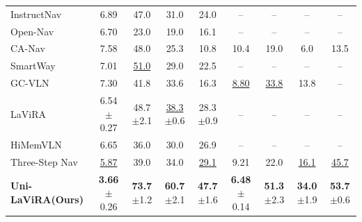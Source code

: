 \documentclass[conference]{IEEEtran}
\newcommand{\ourmethod}{Uni-LaViRA\xspace}
\begin{document}
\begin{table}[t]
{\begin{tabular}{l|cccc|cccc}
InstructNav~\cite{long2024instructnav}              & 6.89 & 47.0 & 31.0 & 24.0 & --   & --   & --   & --   \\
Open-Nav~\cite{qiao2024opennav}                     & 6.70 & 23.0 & 19.0 & 16.1 & --   & --   & --   & --   \\
CA-Nav~\cite{chen2025canav}                         & 7.58 & 48.0 & 25.3 & 10.8 & 10.4 & 19.0 & 6.0  & 13.5 \\
SmartWay~\cite{shi2025smartway}                     & 7.01 & \underline{51.0} & 29.0 & 22.5 & --   & --   & --   & --   \\
GC-VLN~\cite{yin2025gcvln}                          & 7.30 & 41.8 & 33.6 & 16.3 & \underline{8.80} & \underline{33.8} & 13.8 & --   \\
LaViRA~\cite{ding2025lavira}                        & 6.54$\pm$0.27 & 48.7$\pm$2.1 & \underline{38.3}$\pm$0.6 & 28.3$\pm$0.9 & --   & --   & --   & --   \\
HiMemVLN~\cite{lyu2026himemvln}                    & 6.65 & 36.0 & 30.0 & 26.9 & --   & --   & --   & --   \\
Three-Step Nav~\cite{zheng2026threestepnav}        & \underline{5.87} & 39.0 & 34.0 & \underline{29.1} & 9.21 & 22.0 & \underline{16.1} & \underline{45.7} \\
\textbf{\ourmethod (Ours)}                          &
\textbf{3.66}$\pm$0.26 & \textbf{73.7}$\pm$1.2 & \textbf{60.7}$\pm$2.1 & \textbf{47.7}$\pm$1.6 &
\textbf{6.48}$\pm$0.14 & \textbf{51.3}$\pm$2.3 & \textbf{34.0}$\pm$1.9 & \textbf{53.7}$\pm$0.6 \\
\bottomrule
\end{tabular}}
\end{table}
\end{document}
